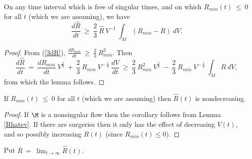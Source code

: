 \begin{lemma}
  \label{lem:kl-noncollapsed-pointed-limits-hyperbolic-noncollapsing-lemma}
 \label{Rhatev}
On any time interval which is free of singular times,
and on which   $R_{min}(t) \: \le \: 0$ for all $t$
(which we are assuming), we have
\begin{equation} \label{Rhat}
\frac{d\hat{R}}{dt} \: \ge \: \frac23 \: \hat{R} \: V^{-1} \:
\int_M (R_{min} - R) \: dV.
\end{equation}
\end{lemma}
\begin{proof}
From (\ref{3dR}), $\frac{dR_{min}}{dt} \: \ge \: \frac23 \: R_{min}^2$.
Then
\begin{equation}
\frac{d\hat{R}}{dt} \: =\: \frac{dR_{min}}{dt} \: V^{\frac23} \: + \:
\frac23 \: R_{min} \: V^{- \: \frac13} \: \frac{dV}{dt} \: \ge \:
\frac23 \: R_{min}^2 \: V^{\frac23} \: - \:
\frac23 \: R_{min} \: V^{- \: \frac13} \: \int_M R \: dV,
\end{equation}
from which the lemma follows.
\end{proof}

\begin{corollary}
  \label{cor:kl-noncollapsed-pointed-limits-hyperbolic-monotonicity-noncollapsing}
 \label{Rmono}
If $R_{min}(t) \: \le \: 0$ for all $t$
(which we are assuming) then $\hat{R}(t)$ is nondecreasing.
\end{corollary}
\begin{proof}
If $\M$ is a nonsingular flow then the corollary follows from Lemma \ref{Rhatev}.
If there are surgeries then it only has the effect of decreasing $V(t)$, and so
possibly increasing $\hat{R}(t)$ (since $R_{min}(t) \le 0$).
\end{proof}

Put $\overline{R} \: = \: \lim_{t \rightarrow \infty} \hat{R}(t)$.

